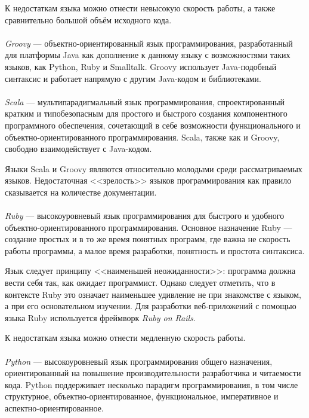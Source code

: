 К недостаткам языка можно отнести невысокую скорость работы, а также
сравнительно большой объём исходного кода.

\paragraph{}
\textit{Groovy} --- объектно-ориентированный язык программирования, разработанный для
платформы Java как дополнение к данному языку с возможностями таких языков, как Python,
Ruby и Smalltalk. Groovy использует Java-подобный синтаксис и работает напрямую с другим
Java-кодом и библиотеками.

\paragraph{}
\textit{Scala} --- мультипарадигмальный язык программирования, спроектированный кратким
и типобезопасным для простого и быстрого создания компонентного программного обеспечения,
сочетающий в себе возможности функционального и объектно-ориентированного программирования.
Scala, также как и Groovy, свободно взаимодействует с Java-кодом.

Языки Scala и Groovy являются относительно молодыми среди рассматриваемых языков.
Недостаточная <<зрелость>> языков программирования как правило сказывается на количестве
документации.

\paragraph{}
\textit{Ruby} --- высокоуровневый язык программирования для быстрого и удобного
объектно-ориентированного программирования. Основное назначение Ruby --- создание
простых и в то же время понятных программ, где важна не скорость работы программы,
а малое время разработки, понятность и простота синтаксиса.

Язык следует принципу <<наименьшей неожиданности>>: программа должна вести себя так,
как ожидает программист. Однако следует отметить, что в контексте Ruby
это означает наименьшее удивление не при знакомстве с языком, а при его основательном изучении.
Для разработки веб-приложений с помощью языка Ruby используется
фреймворк \textit{Ruby on Rails}.

К недостаткам языка можно отнести медленную скорость работы.

\paragraph{}
\textit{Python} --- высокоуровневый язык программирования общего назначения, ориентированный
на повышение производительности разработчика и читаемости кода. Python поддерживает
несколько парадигм программирования, в том числе структурное, объектно-ориентированное,
функциональное, императивное и аспектно-ориентированное.

